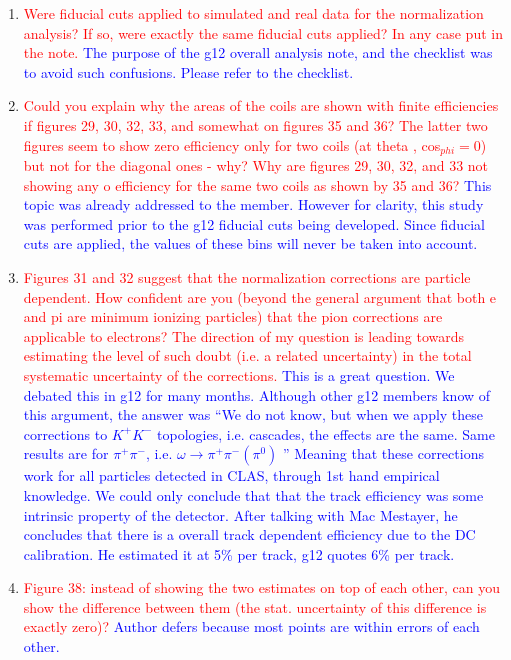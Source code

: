 \documentclass[11pt,a4paper]{article}
\begin{document}
\begin{enumerate}
\item
\textcolor{red}{Were fiducial cuts applied to simulated and real data for the normalization analysis? If so, were exactly the same fiducial cuts applied? In any case put in the note.}
\textcolor{blue}{The purpose of the g12 overall analysis note, and the checklist was to avoid such confusions. Please refer to the checklist.}
\item
\textcolor{red}{Could you explain why the areas of the coils are shown with finite efficiencies if figures 29, 30, 32, 33, and somewhat on figures 35 and 36? The latter two figures seem to show zero efficiency only for two coils (at theta , cos$_{phi}=0$) but not for the diagonal ones - why? Why are figures 29, 30, 32, and 33 not showing any o efficiency for the same two coils as shown by 35 and 36?}
\textcolor{blue}{This topic was already addressed to the member. However for clarity, this study was performed prior to the g12 fiducial cuts being developed. Since fiducial cuts are applied, the values of these bins will never be taken into account.}
\item
\textcolor{red}{Figures 31 and 32 suggest that the normalization corrections are particle dependent. How confident are you (beyond the general argument that both e and pi are minimum ionizing particles) that the pion corrections are applicable to electrons? The direction of my question is leading towards estimating the level of such doubt (i.e. a related uncertainty) in the total systematic uncertainty of the corrections.}
\textcolor{blue}{This is a great question. We debated this in g12 for many months. Although other g12 members know of this argument, the answer was ``We do not know, but when we apply these corrections to $K^+K^-$ topologies, i.e. cascades, the effects are the same. Same results are for $\pi^+\pi^-$, i.e. $\omega\rightarrow\pi^+\pi^-(\pi^0)$ '' Meaning that these corrections work for all particles detected in CLAS, through 1st hand empirical knowledge. We could only conclude that that the track efficiency was some intrinsic property of the detector. After talking with Mac Mestayer, he concludes that there is a overall track dependent efficiency due to the DC calibration. He estimated it at 5\% per track, g12 quotes 6\% per track. }
\item
\textcolor{red}{Figure 38: instead of showing the two estimates on top of each other, can you show the difference between them (the stat. uncertainty of this difference is exactly zero)?}
\textcolor{blue}{Author defers because most points are within errors of each other.}

\end{enumerate}
\end{document}
